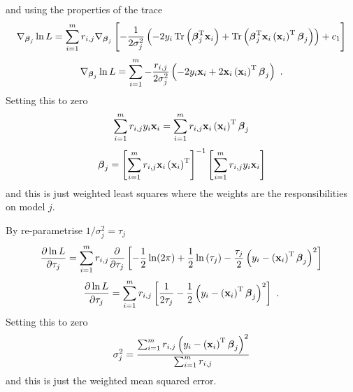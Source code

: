 \documentclass[12pt]{report}
\DeclareMathOperator{\trace}{Tr}
\newcommand{\T}{^\textup{T}}
\newcommand{\vect}[1]{\mathbf{#1}}
\newcommand{\vectGreek}[1]{\boldsymbol{#1}}
\begin{document}
and using the properties of the trace
\begin{equation}
\nabla_{\vectGreek{\beta}_j}\ln{L}
=\sum_{i=1}^{m}
r_{i,j}
\nabla_{\vectGreek{\beta}_j}
\left[-\frac{1}{2\sigma_j^2}\left(-2y_i\trace\left(\vectGreek{\beta}_j\T\vect{x}_i\right)
+\trace\left(\vectGreek{\beta}_j\T\vect{x}_i\left(\vect{x}_i\right)\T\vectGreek{\beta}_j
\right)\right)
+c_1
\right]
\end{equation}
\begin{equation}
\nabla_{\vectGreek{\beta}_j}\ln{L}
=\sum_{i=1}^{m}
-\frac{r_{i,j}}{2\sigma_j^2}
\left(-2y_i\vect{x}_i
+2\vect{x}_i\left(\vect{x}_i\right)\T\vectGreek{\beta}_j
\right) \ .
\end{equation}
Setting this to zero
\begin{equation}
\sum_{i=1}^{m}
r_{i,j}
y_i\vect{x}_i
=
\sum_{i=1}^{m}r_{i,j}
\vect{x}_i\left(\vect{x}_i\right)\T\vectGreek{\beta}_j
\end{equation}
\begin{equation}
\vectGreek{\beta}_j
=
\left[\sum_{i=1}^{m}r_{i,j}
\vect{x}_i\left(\vect{x}_i\right)\T\right]^{-1}
\left[\sum_{i=1}^{m}
r_{i,j}
y_i\vect{x}_i\right]
\end{equation}
and this is just weighted least squares where the weights are the responsibilities on model $j$.

By re-parametrise $1/\sigma_j^2=\tau_j$
\begin{equation}
\frac{\partial\ln{L}}{\partial\tau_j}
=\sum_{i=1}^{m}
r_{i,j}
\frac{\partial}{\partial\tau_j}
\left[
	-\frac{1}{2}\ln(2\pi) + \frac{1}{2}\ln\left(\tau_j\right)-\frac{\tau_j}{2}\left({y_i-\left(\vect{x}_i\right)\T\vectGreek{\beta}_j}\right)^2
\right]
\end{equation}
\begin{equation}
\frac{\partial\ln{L}}{\partial\tau_j}
=\sum_{i=1}^{m}
r_{i,j}
\left[\frac{1}{2\tau_j}-\frac{1}{2}\left({y_i-\left(\vect{x}_i\right)\T\vectGreek{\beta}_j}\right)^2
\right] \ .
\end{equation}
Setting this to zero
\begin{equation}
\sigma_j^2
=
\frac{\sum_{i=1}^{m}
r_{i,j}\left({y_i-\left(\vect{x}_i\right)\T\vectGreek{\beta}_j}\right)^2}
{\sum_{i=1}^{m}r_{i,j}}
\end{equation}
and this is just the weighted mean squared error.
\end{document}

